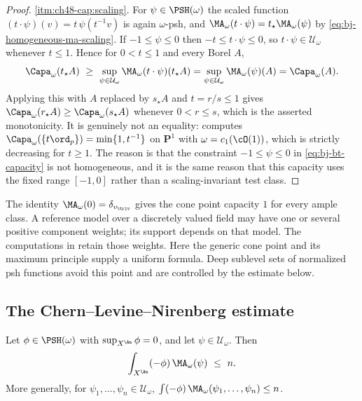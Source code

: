 \begin{proof}
\cref{itm:ch48-cap:scaling}.  For $\psi\in\PSH(\omega)$ the scaled
function $(t\cdot\psi)(v)=t\,\psi(t^{-1}v)$ is again $\omega$-psh, and
$\MA_\omega(t\cdot\psi)=t_\star\MA_\omega(\psi)$ by
\eqref{eq:bj-homogeneous-ma-scaling}.  If $-1\le\psi\le0$ then
$-t\le t\cdot\psi\le0$, so $t\cdot\psi\in\mathcal U_\omega$ whenever
$t\le1$.  Hence for $0<t\le1$ and every Borel $A$,
\[
 \Capa_\omega(t_\star A)\ \ge\ \sup_{\psi\in\mathcal U_\omega}
   \MA_\omega(t\cdot\psi)(t_\star A)
 =\sup_{\psi\in\mathcal U_\omega}\MA_\omega(\psi)(A)=\Capa_\omega(A).
\]
Applying this with $A$ replaced by $s_\star A$ and $t=r/s\le1$ gives
$\Capa_\omega(r_\star A)\ge\Capa_\omega(s_\star A)$ whenever
$0<r\le s$, which is the asserted monotonicity.  It is genuinely not an
equality:  computes
$\Capa_\omega(\{t\ord_p\})=\min\{1,t^{-1}\}$ on $\mathbf P^1$ with
$\omega=c_1(\cO(1))$, which is strictly decreasing for $t\ge1$.  The
reason is that the constraint $-1\le\psi\le0$ in
\eqref{eq:bj-bt-capacity} is not homogeneous, and it is the same reason
that this capacity uses the fixed range $[-1,0]$ rather than a
scaling-invariant test class.
\end{proof}

\begin{remark}
\label{rem:ch48-cone-point}
The identity $\MA_\omega(0)=\delta_{v_{\triv}}$ gives the cone point
capacity $1$ for every ample class. A reference model over a discretely
valued field may have one or several positive component weights; its
support depends on that model. The computations in
retain those weights. Here the generic cone point and its maximum
principle supply a uniform formula. Deep sublevel sets of normalized psh
functions avoid this point and are controlled by the estimate below.
\end{remark}

\subsection{The Chern--Levine--Nirenberg estimate}
\label{sec:ch48-cln}

\begin{lemma}
\label{lem:ch48-cln}
Let $\phi\in\PSH(\omega)$ with $\sup_{X^{\An}}\phi=0$, and let
$\psi\in\mathcal U_\omega$.  Then
\[
 \int_{X^{\An}}(-\phi)\,\MA_\omega(\psi)\ \le\ n .
\]
More generally, for $\psi_1,\dots,\psi_n\in\mathcal U_\omega$,
$\int(-\phi)\,\MA_\omega(\psi_1,\dots,\psi_n)\le n$.
\end{lemma}

